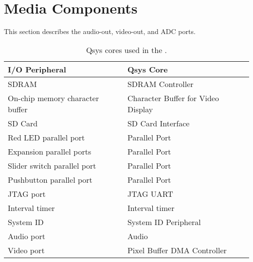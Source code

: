 


\section{Media Components}
\label{sec:multi}

This section describes the audio-out, video-out, and ADC ports.







\begin{table}[h]
    \begin{center}
    \begin{tabular}{l|l}
            \textbf{I/O Peripheral}
            & \textbf{Qsys Core}
        \\\hline
            SDRAM
            & SDRAM Controller
        \\
            On-chip memory character buffer
				& Character Buffer for Video Display
        \\
            SD Card
        &   SD Card Interface
        \\
            Red LED parallel port
				& Parallel Port
        \\
            Expansion parallel ports
				& Parallel Port
        \\
            Slider switch parallel port
				& Parallel Port
        \\
            Pushbutton parallel port
				& Parallel Port
        \\
            JTAG port
				& JTAG UART
        \\
            Interval timer
				& Interval timer 
        \\
            System ID
				& System ID Peripheral
        \\
            Audio port
				& Audio
        \\
            Video port
				& Pixel Buffer DMA Controller
        \\
    \end{tabular}
    \caption{Qsys cores used in the \systemName.}
    \label{tab:sopcnames}
    \end{center}
\end{table}

